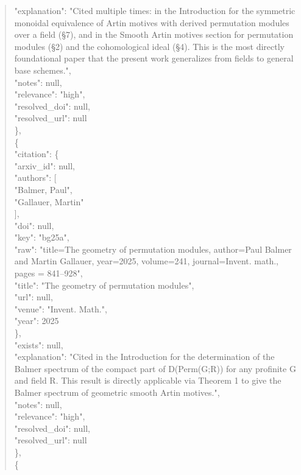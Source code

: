 \documentclass[11pt]{article}
\begin{document}
\begin{quote}
      "explanation": "Cited multiple times: in the Introduction for the symmetric monoidal equivalence of Artin motives with derived permutation modules over a field (§7), and in the Smooth Artin motives section for permutation modules (§2) and the cohomological ideal (§4). This is the most directly foundational paper that the present work generalizes from fields to general base schemes.",\\
      "notes": null,\\
      "relevance": "high",\\
      "resolved\_doi": null,\\
      "resolved\_url": null\\
    \},\\
    \{\\
      "citation": \{\\
        "arxiv\_id": null,\\
        "authors": [\\
          "Balmer, Paul",\\
          "Gallauer, Martin"\\
        ],\\
        "doi": null,\\
        "key": "bg25a",\\
        "raw": "title=The geometry of permutation modules, author=Paul Balmer and Martin Gallauer, year=2025, volume=241, journal=Invent. math., pages = 841--928",\\
        "title": "The geometry of permutation modules",\\
        "url": null,\\
        "venue": "Invent. Math.",\\
        "year": 2025\\
      \},\\
      "exists": null,\\
      "explanation": "Cited in the Introduction for the determination of the Balmer spectrum of the compact part of D(Perm(G;R)) for any profinite G and field R. This result is directly applicable via Theorem 1 to give the Balmer spectrum of geometric smooth Artin motives.",\\
      "notes": null,\\
      "relevance": "high",\\
      "resolved\_doi": null,\\
      "resolved\_url": null\\
    \},\\
    \{\\

\end{quote}
\end{document}
